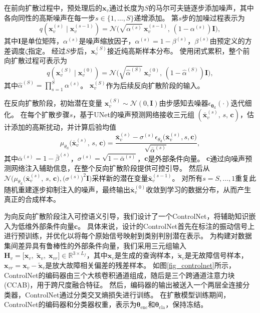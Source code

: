 \documentclass[UTF8,lettersize,journal]{IEEEtran}
\begin{document}
在前向扩散过程中，预处理后的$\bm{x}_v$通过长度为$S$的马尔可夫链逐步添加噪声，其中各向同性的高斯噪声在每一步$s \in \{1,\dots ,S\}$递增添加。
第$s$步的加噪过程表示为
\begin{equation}
q(\bm{x}_v^{(s)} \mid \bm{x}_v^{(s-1)}) = \mathcal{N}\!\bigl(\sqrt{\alpha^{(s)}}\,\bm{x}_v^{(s-1)},\, (1-\alpha^{(s)})\bm{I}\bigr),
\end{equation}
其中$\bm{I}$是单位矩阵，$\alpha^{(s)}$是噪声缩放因子，$\alpha^{(s)} = 1 - \beta^{(s)}$，$\beta^{(s)}$由预定义的方差调度$\zeta$指定。
经过$S$步后，$\bm{x}_v^{(S)}$接近纯高斯样本分布。
使用闭式累积，整个前向扩散过程可表示为
\begin{equation}
q(\bm{x}_v^{(S)} \mid \bm{x}_v^{(0)}) = \mathcal{N}\!\bigl(\sqrt{\hat{\alpha}^{(S)}}\,\bm{x}_v^{(0)},\,(1-\hat{\alpha}^{(S)})\bm{I}\bigr),
\end{equation}
其中$\hat{\alpha}^{(S)} = \prod_{s=1}^{S} {\alpha}^{(s)}$。
$\bm{x}_v^{(S)}$作为后续反向扩散阶段的输入。

在反向扩散阶段，初始潜在变量
$\bm{x}_v^{(S)} \sim \mathcal{N}(0,\bm{I})$由步感知去噪器$\epsilon_{\bm{\theta}_\mathrm{d}}(\cdot)$迭代细化。
在每个扩散步骤$s$，基于UNet的噪声预测网络接收三元组
$(\bar{\bm{x}}_v^{(s)},\,s,\,\bm{c})$，估计添加的高斯扰动，并计算后验均值
\begin{equation}
	\mu_{{\theta}_\mathrm{d}} \bigl(\bar{\bm{x}}_v^{(s)},\,s,\,\bm{c}\bigr)
	= \frac{\bar{\bm{x}}_v^{(s)} - \sigma^{(s)} \epsilon_{{\theta}_\mathrm{d}} \bigl(\bar{\bm{x}}_v^{(s)}, s, \bm{c}\bigr)}
	{\sqrt{\bar{\alpha}^{(s)}}},
\end{equation}
其中$\bar{\alpha}^{(s)} = 1-\bar{\beta}^{(s)}$，$\sigma^{(s)} = \sqrt{1-\bar{\alpha}^{(s)}}$，$\bm{c}$是外部条件向量。
$\bm{c}$通过向噪声预测网络注入辅助信息，在整个反向扩散阶段提供可控引导。
然后从$\mathcal{N} \bigl(
\mu_{{\theta}_\mathrm{d}} \bigl(\bar{\bm{x}}_v^{(s)},\,s,\,\bm{c}\bigr), \bigl(\sigma^{(s)}\bigr)^{2}\bm{I}\bigr)$采样新的潜在变量$\bar{\bm{x}}_v^{(s-1)}$。
对所有$s = S,\ldots,1$重复此随机重建逐步抑制注入的噪声，最终输出$\bar{\bm{x}}_v^{(0)}$收敛到学习的数据分布，从而产生真正的合成样本。

为向反向扩散阶段注入可控语义引导，我们设计了一个ControlNet，将辅助知识嵌入为低维外部条件向量$\bm{c}$。
具体来说，设计的ControlNet首先在标注的振动信号上进行预训练，并优化以将每个原始信号映射到类别判别潜在表示。
为构建对数据集间差异具有鲁棒性的外部条件向量，我们采用三元组输入$\bm{H}_{v} = \bigl[\bm{x}_{v},\;\tilde{\bm{x}}_{v},\;\bm{x}_{vr}\bigr]\in\mathbb{R}^{3 \times L_{f}}$，其中$\bm{x}_{v}$是生成的查询样本，$\tilde{\bm{x}}_{v}$是无故障信号样本，$\bm{x}_{vr}=\bm{x}_{v}-\tilde{\bm{x}}_{v}$是放大故障相关偏差的残差样本。
如图\ref{fig_controlnet}所示，ControlNet的编码器由三个大核卷积通道组成，随后是三个跨通道注意力块(CCAB)，用于跨尺度融合特征。
然后，编码器的输出被送入一个两层全连接分类器，ControlNet通过分类交叉熵损失进行训练。
在扩散模型训练期间，ControlNet的编码器和分类器权重，表示为$\bm{\theta}_\mathrm{enc}$和$\bm{\theta}_\mathrm{cla}$，保持冻结。
\end{document}
